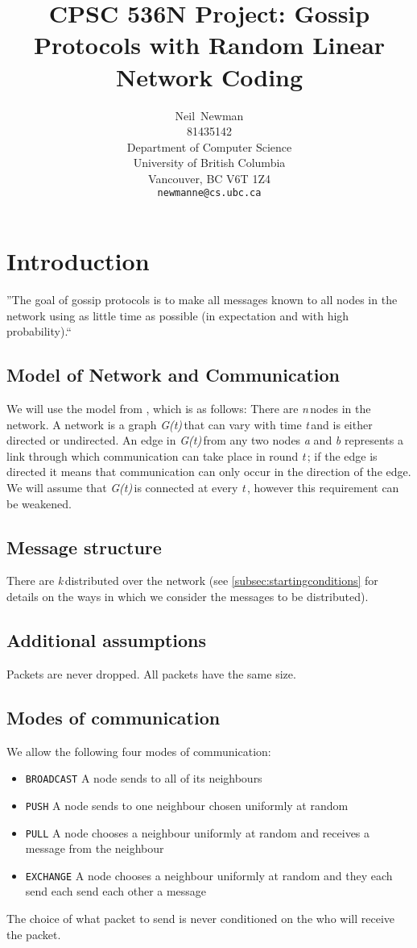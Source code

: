 \documentclass{article} %
\title{CPSC 536N Project: Gossip Protocols with Random Linear Network Coding}
\author{
Neil~Newman\\
81435142\\
Department of Computer Science\\
University of British Columbia\\
Vancouver, BC V6T 1Z4 \\
\texttt{newmanne@cs.ubc.ca}
}
\def\numNodes{\textit{n}\,}
\def\graph{\textit{G(t)}\,}
\def\graphtime{\textit{t}\,}
\def\numMessages{\textit{k}\,}
\begin{document}
\maketitle

\section{Introduction}
''The goal of gossip protocols is to make all messages known to all nodes in the network using as little time as possible (in expectation and with high probability).``

\subsection{Model of Network and Communication}
We will use the model from \cite{haeupler2011analyzing}, which is as follows: There are \numNodes nodes in the network. A network is a graph \graph that can vary with time \graphtime and is either directed or undirected. An edge in \graph from any two nodes \textit{a} and \textit{b} represents a link through which communication can take place in round \graphtime; if the edge is directed it means that communication can only occur in the direction of the edge. We will assume that \graph is connected at every \graphtime, however this requirement can be weakened. 

\subsection{Message structure}
There are \numMessages distributed over the network (see \ref{subsec:startingconditions} for details on the ways in which we consider the messages to be distributed). 

\subsection{Additional assumptions}
Packets are never dropped. All packets have the same size. 

\subsection{Modes of communication}
We allow the following four modes of communication:
\begin{itemize}
\item \texttt{BROADCAST} A node sends to all of its neighbours
\item \texttt{PUSH} A node sends to one neighbour chosen uniformly at random
\item \texttt{PULL} A node chooses a neighbour uniformly at random and receives a message from the neighbour
\item \texttt{EXCHANGE} A node chooses a neighbour uniformly at random and they each send each send each other a message
\end{itemize}
The choice of what packet to send is never conditioned on the who will receive the packet.
\end{document}
